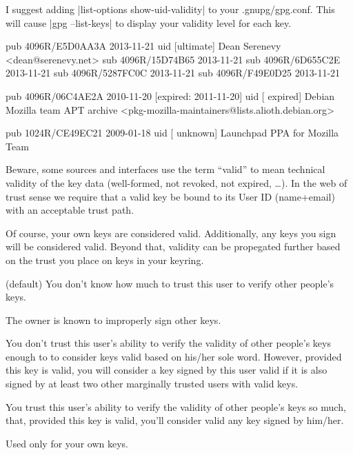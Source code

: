 \documentclass[letterpaper]{article}
\makeatletter
\def\section{\@startsection{section}{1}{\z@}{-2ex\@plus-.5ex\@minus-.2ex}{.001ex\@plus0ex\@minus.3ex}{\normalfont\Large\sffamily\bfseries}}
\def\tightitems{\setlength{\parskip}{0pt}}
\def\TODO#1{\textsl{[[TODO: #1]]}}
\renewcommand{\_}[1]{\ifmmode_{_{#1}}\else\underline{\phantom{n}}$\,$#1\fi}
\makeatother
\begin{document}
\section{Web of Trust}


I suggest adding |list-options show-uid-validity| to your .gnupg/gpg.conf.
This will cause |gpg --list-keys| to display your validity level for each
key.

\begin{code}
  pub   4096R/E5D0AA3A 2013-11-21
  uid       [ultimate] Dean Serenevy <dean@serenevy.net>
  sub   4096R/15D74B65 2013-11-21
  sub   4096R/6D655C2E 2013-11-21
  sub   4096R/5287FC0C 2013-11-21
  sub   4096R/F49E0D25 2013-11-21

  pub   4096R/06C4AE2A 2010-11-20 [expired: 2011-11-20]
  uid       [ expired] Debian Mozilla team APT archive <pkg-mozilla-maintainers@lists.alioth.debian.org>

  pub   1024R/CE49EC21 2009-01-18
  uid       [ unknown] Launchpad PPA for Mozilla Team
\end{code}

Beware, some sources and interfaces use the term ``valid'' to mean
technical validity of the key data (well-formed, not revoked, not expired,
\dots). In the web of trust sense we require that a valid key be bound to
its User ID (name+email) with an acceptable trust path.

Of course, your own keys are considered valid. Additionally, any keys you
sign will be considered valid. Beyond that, validity can be propegated
further based on the trust you place on keys in your keyring.

\begin{description}\tightitems
\item[Unknown] (default) You don't know how much to trust this user to
  verify other people's keys.

\item[Never] The owner is known to improperly sign other keys.

\item[Marginal] You don't trust this user's ability to verify the validity
  of other people's keys enough to to consider keys valid based on his/her
  sole word. However, provided this key is valid, you will consider a key
  signed by this user valid if it is also signed by at least two other
  marginally trusted users with valid keys.

\item[Full] You trust this user's ability to verify the validity of other
  people's keys so much, that, provided this key is valid, you'll consider
  valid any key signed by him/her.

\item[Ultimate] Used only for your own keys.
\end{description}
\end{document}
